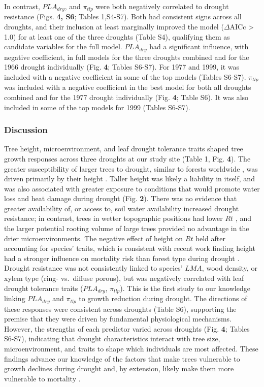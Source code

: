\documentclass[
]{article}
\begin{document}
In contrast, \(PLA_{dry}\), and \(\pi_{tlp}\) were both negatively
correlated to drought resistance (Figs. \textbf{4, S6}; Tables 1,S4-S7).
Both had consistent signs across all droughts, and their inclusion at
least marginally improved the model (\(\Delta\)AICc \textgreater{} 1.0)
for at least one of the three droughts (Table S4), qualifying them as
candidate variables for the full model. \(PLA_{dry}\) had a significant
influence, with negative coefficient, in full models for the three
droughts combined and for the 1966 drought individually (Fig.
\textbf{4}; Tables S6-S7). For 1977 and 1999, it was included with a
negative coefficient in some of the top models (Tables S6-S7).
\(\pi_{tlp}\) was included with a negative coefficient in the best model
for both all droughts combined and for the 1977 drought individually
(Fig. \textbf{4}; Table S6). It was also included in some of the top
models for 1999 (Tables S6-S7).

\hypertarget{discussion}{%
\subsubsection{Discussion}\label{discussion}}

Tree height, microenvironment, and leaf drought tolerance traits shaped
tree growth responses across three droughts at our study site (Table 1,
Fig. \textbf{4}). The greater susceptibility of larger trees to drought,
similar to forests worldwide \citep{bennett_larger_2015}, was driven
primarily by their height \citep{stovall_tree_2019}. Taller height was
likely a liability in itself, and was also associated with greater
exposure to conditions that would promote water loss and heat damage
during drought (Fig. \textbf{2}). There was no evidence that greater
availability of, or access to, soil water availability increased drought
resistance; in contrast, trees in wetter topographic positions had lower
\(Rt\) \citep{zuleta_drought-induced_2017, stovall_tree_2019}, and the
larger potential rooting volume of large trees provided no advantage in
the drier microenvironments. The negative effect of height on \(Rt\)
held after accounting for species' traits, which is consistent with
recent work finding height had a stronger influence on mortality risk
than forest type during drought \citep{stovall_reply_2020}. Drought
resistance was not consistently linked to species' \(LMA\), wood
density, or xylem type (ring- vs.~diffuse porous), but was negatively
correlated with leaf drought tolerance traits (\(PLA_{dry}\),
\(\pi_{tlp}\)). This is the first study to our knowledge linking
\(PLA_{dry}\) and \(\pi_{tlp}\) to growth reduction during drought. The
directions of these responses were consistent across droughts (Table
S6), supporting the premise that they were driven by fundamental
physiological mechanisms. However, the strengths of each predictor
varied across droughts (Fig. \textbf{4}; Tables S6-S7), indicating that
drought characteristics interact with tree size, microenvironment, and
traits to shape which individuals are most affected. These findings
advance our knowledge of the factors that make trees vulnerable to
growth declines during drought and, by extension, likely make them more
vulnerable to mortality \citep{sapes_plant_2019}.
\end{document}

